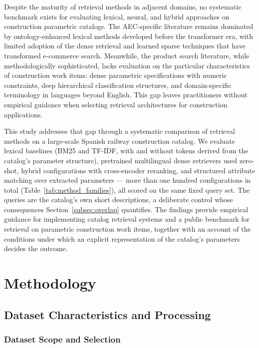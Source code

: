 \documentclass[preprint,review,12pt]{elsarticle}
\begin{document}
Despite the maturity of retrieval methods in adjacent domains, no systematic benchmark exists for evaluating lexical, neural, and hybrid approaches on construction parametric catalogs. The AEC-specific literature remains dominated by ontology-enhanced lexical methods developed before the transformer era, with limited adoption of the dense retrieval and learned sparse techniques that have transformed e-commerce search. Meanwhile, the product search literature, while methodologically sophisticated, lacks evaluation on the particular characteristics of construction work items: dense parametric specifications with numeric constraints, deep hierarchical classification structures, and domain-specific terminology in languages beyond English. This gap leaves practitioners without empirical guidance when selecting retrieval architectures for construction applications.

This study addresses that gap through a systematic comparison of retrieval methods on a large-scale Spanish railway construction catalog. We evaluate lexical baselines (BM25 and TF-IDF, with and without tokens derived from the catalog's parameter structure), pretrained multilingual dense retrievers used zero-shot, hybrid configurations with cross-encoder reranking, and structured attribute matching over extracted parameters --- more than one hundred configurations in total (Table~\ref{tab:method_families}), all scored on the same fixed query set. The queries are the catalog's own short descriptions, a deliberate control whose consequences Section~\ref{subsec:overlap} quantifies. The findings provide empirical guidance for implementing catalog retrieval systems and a public benchmark for retrieval on parametric construction work items, together with an account of the conditions under which an explicit representation of the catalog's parameters decides the outcome.

\section{Methodology}

\subsection{Dataset Characteristics and Processing}

\subsubsection{Dataset Scope and Selection}
\end{document}
